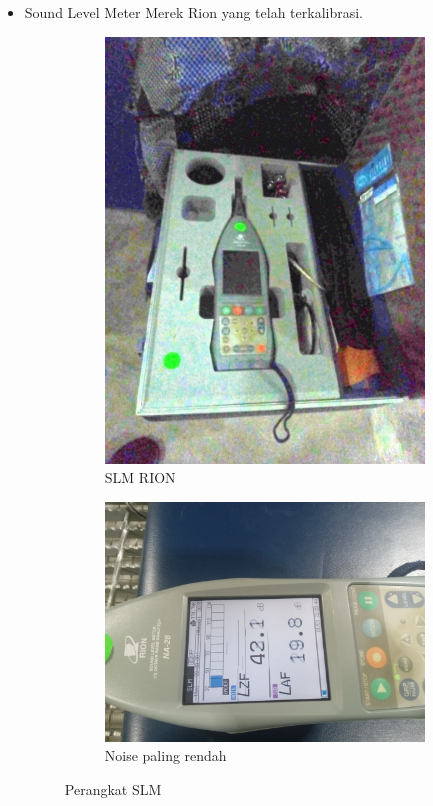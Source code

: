 \documentclass{article}
\begin{document}
	\begin{itemize}
		\item Sound Level Meter Merek Rion yang telah terkalibrasi.
		
		\begin{figure}[H]
			\centering
			\begin{subfigure}[]{.35\textwidth}
				\includegraphics[width=\textwidth]{images/tools_slm_box}
				\caption{SLM RION}
			\end{subfigure}
			\begin{subfigure}[]{.25\textwidth}
				\includegraphics[width=\textwidth]{images/slm_lowest}
				\caption{Noise paling rendah}
			\end{subfigure}
			\caption{Perangkat SLM}
		\end{figure}
	

\end{itemize}
\end{document}
